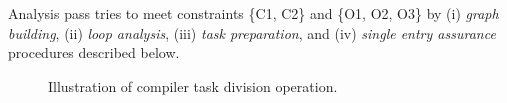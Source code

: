 Analysis pass tries to meet constraints \{C1, C2\} and \{O1, O2, O3\} by (i) \emph{graph building}, (ii) \emph{loop analysis}, (iii) \emph{task preparation}, and (iv) \emph{single entry assurance} procedures described below.

\begin{figure}
	\centering
	\caption{Illustration of \sys compiler task division operation.}
	\label{fig:compiler_overview}
\end{figure}

